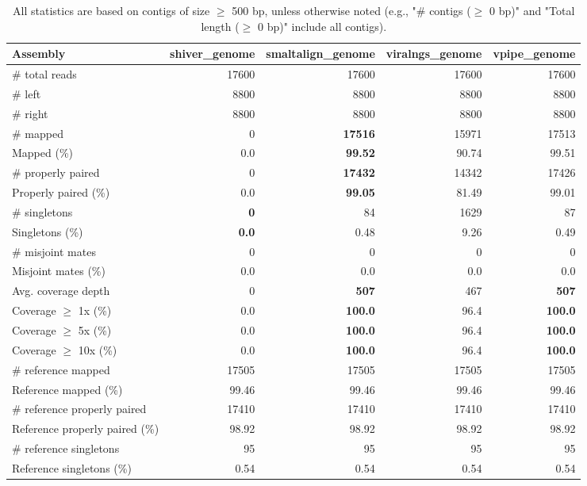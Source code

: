 \documentclass[12pt,a4paper]{article}
\begin{document}
\begin{table}[ht]
\begin{center}
\caption{All statistics are based on contigs of size $\geq$ 500 bp, unless otherwise noted (e.g., "\# contigs ($\geq$ 0 bp)" and "Total length ($\geq$ 0 bp)" include all contigs).}
\begin{tabular}{|l*{4}{|r}|}
\hline
Assembly & shiver\_genome & smaltalign\_genome & viralngs\_genome & vpipe\_genome \\ \hline
\# total reads & 17600 & 17600 & 17600 & 17600 \\ \hline
\# left & 8800 & 8800 & 8800 & 8800 \\ \hline
\# right & 8800 & 8800 & 8800 & 8800 \\ \hline
\# mapped & 0 & {\bf 17516} & 15971 & 17513 \\ \hline
Mapped (\%) & 0.0 & {\bf 99.52} & 90.74 & 99.51 \\ \hline
\# properly paired & 0 & {\bf 17432} & 14342 & 17426 \\ \hline
Properly paired (\%) & 0.0 & {\bf 99.05} & 81.49 & 99.01 \\ \hline
\# singletons & {\bf 0} & 84 & 1629 & 87 \\ \hline
Singletons (\%) & {\bf 0.0} & 0.48 & 9.26 & 0.49 \\ \hline
\# misjoint mates & 0 & 0 & 0 & 0 \\ \hline
Misjoint mates (\%) & 0.0 & 0.0 & 0.0 & 0.0 \\ \hline
Avg. coverage depth & 0 & {\bf 507} & 467 & {\bf 507} \\ \hline
Coverage $\geq$ 1x (\%) & 0.0 & {\bf 100.0} & 96.4 & {\bf 100.0} \\ \hline
Coverage $\geq$ 5x (\%) & 0.0 & {\bf 100.0} & 96.4 & {\bf 100.0} \\ \hline
Coverage $\geq$ 10x (\%) & 0.0 & {\bf 100.0} & 96.4 & {\bf 100.0} \\ \hline
\# reference mapped & 17505 & 17505 & 17505 & 17505 \\ \hline
Reference mapped (\%) & 99.46 & 99.46 & 99.46 & 99.46 \\ \hline
\# reference properly paired & 17410 & 17410 & 17410 & 17410 \\ \hline
Reference properly paired (\%) & 98.92 & 98.92 & 98.92 & 98.92 \\ \hline
\# reference singletons & 95 & 95 & 95 & 95 \\ \hline
Reference singletons (\%) & 0.54 & 0.54 & 0.54 & 0.54 \\ \hline

\end{tabular}
\end{center}
\end{table}
\end{document}
